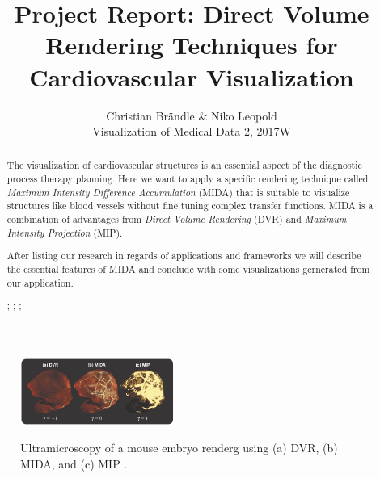 \documentclass{egpubl}
\title{Project Report: Direct Volume Rendering Techniques for Cardiovascular Visualization}
\author{Christian Br{\"a}ndle \& Niko Leopold \\ Visualization of Medical Data 2, 2017W}
\begin{document}
\graphicspath{{images/}}

\maketitle


\begin{abstract}
	The visualization of cardiovascular structures is an essential aspect of the diagnostic process therapy planning.
	Here we want to apply a specific rendering technique called \emph{Maximum Intensity Difference Accumulation} (MIDA) \cite{bruckner2009instant} that is suitable to visualize structures like blood vessels without fine tuning complex transfer functions. MIDA is a combination of advantages from \emph{Direct Volume Rendering} (DVR) and \emph{Maximum Intensity Projection} (MIP).
	
	After listing our research in regards of applications and frameworks we will describe the essential features of MIDA and conclude with some visualizations gernerated from our application. 
		
	\begin{classification} %
		;
		;
		;
	\end{classification}
	
\end{abstract}


\begin{figure}[h]
	\centering
	\includegraphics[width=0.45\textwidth]{MIDA_MouseEmbryo_II.png} \\
	\caption{ Ultramicroscopy of a mouse embryo renderg using (a) DVR, (b) MIDA, and (c) MIP \cite{bruckner2009instant}.}
	\label{fig:MIDA_MouseEmbryo_II}
\end{figure}
\end{document}
